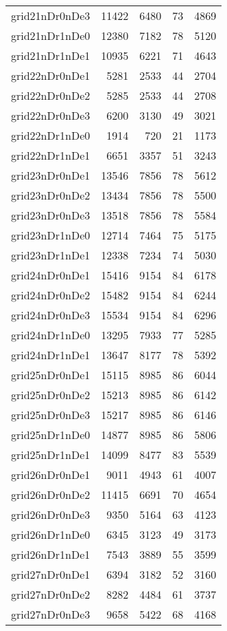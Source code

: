 \begin{longtable}{lrrrr}
grid21nDr0nDe3 & 11422 & 6480 & 73 & 4869 \\
grid21nDr1nDe0 & 12380 & 7182 & 78 & 5120 \\
grid21nDr1nDe1 & 10935 & 6221 & 71 & 4643 \\
grid22nDr0nDe1 & 5281 & 2533 & 44 & 2704 \\
grid22nDr0nDe2 & 5285 & 2533 & 44 & 2708 \\
grid22nDr0nDe3 & 6200 & 3130 & 49 & 3021 \\
grid22nDr1nDe0 & 1914 & 720 & 21 & 1173 \\
grid22nDr1nDe1 & 6651 & 3357 & 51 & 3243 \\
grid23nDr0nDe1 & 13546 & 7856 & 78 & 5612 \\
grid23nDr0nDe2 & 13434 & 7856 & 78 & 5500 \\
grid23nDr0nDe3 & 13518 & 7856 & 78 & 5584 \\
grid23nDr1nDe0 & 12714 & 7464 & 75 & 5175 \\
grid23nDr1nDe1 & 12338 & 7234 & 74 & 5030 \\
grid24nDr0nDe1 & 15416 & 9154 & 84 & 6178 \\
grid24nDr0nDe2 & 15482 & 9154 & 84 & 6244 \\
grid24nDr0nDe3 & 15534 & 9154 & 84 & 6296 \\
grid24nDr1nDe0 & 13295 & 7933 & 77 & 5285 \\
grid24nDr1nDe1 & 13647 & 8177 & 78 & 5392 \\
grid25nDr0nDe1 & 15115 & 8985 & 86 & 6044 \\
grid25nDr0nDe2 & 15213 & 8985 & 86 & 6142 \\
grid25nDr0nDe3 & 15217 & 8985 & 86 & 6146 \\
grid25nDr1nDe0 & 14877 & 8985 & 86 & 5806 \\
grid25nDr1nDe1 & 14099 & 8477 & 83 & 5539 \\
grid26nDr0nDe1 & 9011 & 4943 & 61 & 4007 \\
grid26nDr0nDe2 & 11415 & 6691 & 70 & 4654 \\
grid26nDr0nDe3 & 9350 & 5164 & 63 & 4123 \\
grid26nDr1nDe0 & 6345 & 3123 & 49 & 3173 \\
grid26nDr1nDe1 & 7543 & 3889 & 55 & 3599 \\
grid27nDr0nDe1 & 6394 & 3182 & 52 & 3160 \\
grid27nDr0nDe2 & 8282 & 4484 & 61 & 3737 \\
grid27nDr0nDe3 & 9658 & 5422 & 68 & 4168 \\

\end{longtable}

